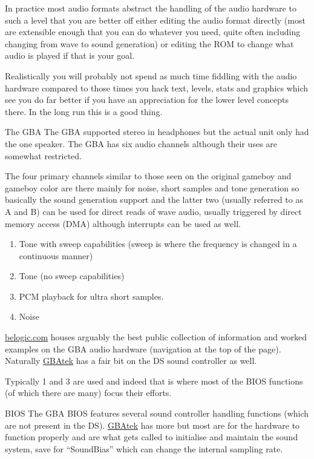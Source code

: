 \documentclass[
]{book}
\providecommand{\tightlist}{%
  \setlength{\itemsep}{0pt}\setlength{\parskip}{0pt}}
\begin{document}
In practice most audio formats abstract the handling of the audio hardware to such a level that you are better off either editing the audio format directly (most are extensible enough that you can do whatever you need, quite often including changing from wave to sound generation) or editing the ROM to change what audio is played if that is your goal.

Realistically you will probably not spend as much time fiddling with the audio hardware compared to those times you hack text, levels, stats and graphics which see you do far better if you have an appreciation for the lower level concepts there. In the long run this is a good thing.

The GBA The GBA supported stereo in headphones but the actual unit only had the one speaker. The GBA has six audio channels although their uses are somewhat restricted.

The four primary channels similar to those seen on the original gameboy and gameboy color are there mainly for noise, short samples and tone generation so basically the sound generation support and the latter two (usually referred to as A and B) can be used for direct reads of wave audio, usually triggered by direct memory access (DMA) although interrupts can be used as well.

\begin{enumerate}
\def\labelenumi{\arabic{enumi}.}
\tightlist
\item
  Tone with sweep capabilities (sweep is where the frequency is changed in a continuous manner)
\item
  Tone (no sweep capabilities)
\item
  PCM playback for ultra short samples.
\item
  Noise
\end{enumerate}

\href{http://belogic.com/gba/}{belogic.com} houses arguably the best public collection of information and worked examples on the GBA audio hardware (navigation at the top of the page). Naturally \href{http://problemkaputt.de/gbatek.htm\#gbasoundcontroller}{GBAtek} has a fair bit on the DS sound controller as well.

Typically 1 and 3 are used and indeed that is where most of the BIOS functions (of which there are many) focus their efforts.

BIOS The GBA BIOS features several sound controller handling functions (which are not present in the DS). \href{http://problemkaputt.de/gbatek.htm\#biossoundfunctions}{GBAtek} has more but most are for the hardware to function properly and are what gets called to initialise and maintain the sound system, save for ``SoundBias'' which can change the internal sampling rate.
\end{document}
